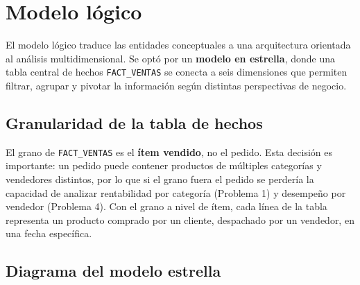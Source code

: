 \documentclass[11pt,a4paper]{article}
\begin{document}
\section{Modelo lógico}

El modelo lógico traduce las entidades conceptuales a una arquitectura orientada al análisis multidimensional. Se optó por un \textbf{modelo en estrella}, donde una tabla central de hechos \texttt{FACT\_VENTAS} se conecta a seis dimensiones que permiten filtrar, agrupar y pivotar la información según distintas perspectivas de negocio.

\subsection{Granularidad de la tabla de hechos}

El grano de \texttt{FACT\_VENTAS} es el \textbf{ítem vendido}, no el pedido. Esta decisión es importante: un pedido puede contener productos de múltiples categorías y vendedores distintos, por lo que si el grano fuera el pedido se perdería la capacidad de analizar rentabilidad por categoría (Problema 1) y desempeño por vendedor (Problema 4). Con el grano a nivel de ítem, cada línea de la tabla representa un producto comprado por un cliente, despachado por un vendedor, en una fecha específica.

\subsection{Diagrama del modelo estrella}
\end{document}
